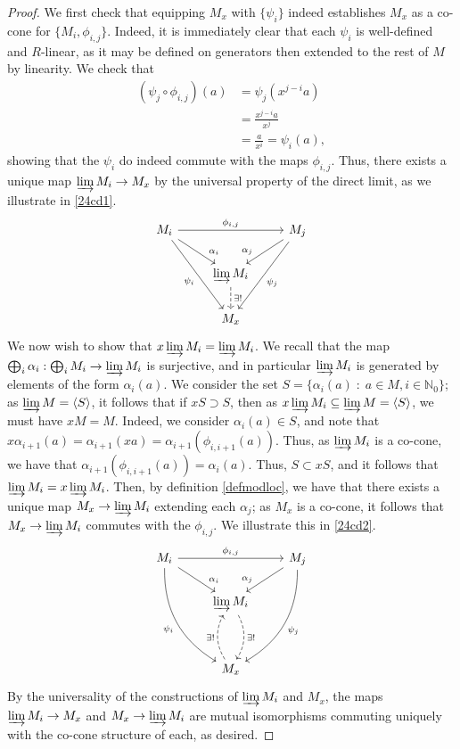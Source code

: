 \documentclass[english]{article}
\newcommand{\NN}{\mathbb{N}}
\theoremstyle{remark}
\theoremstyle{definition}
\newcommand{\idl}[1]{\left\langle{#1}\right\rangle }
\newcommand{\colim}{\varinjlim}
\begin{document}
\begin{proof}
We first check that equipping $M_x$ with $\{\psi_i\}$ indeed establishes $M_x$ as a co-cone for $\{M_i,\phi_{i,j}\}$. Indeed, it is immediately clear that each $\psi_i$ is well-defined and $R$-linear, as it may be defined on generators then extended to the rest of $M$ by linearity. We check that \begin{align*}
(\psi_j\circ\phi_{i,j})(a)&=\psi_j(x^{j-i}a)\\&=\frac{x^{j-i}a}{x^j}\\&=\frac{a}{x^i}=\psi_i(a),\end{align*} showing that the $\psi_i$ do indeed commute with the maps $\phi_{i,j}$. Thus, there exists a unique map $\colim M_i\to M_x$ by the universal property of the direct limit, as we illustrate in \eqref{24cd1}.
\begin{equation}
\label{24cd1} \begin{tikzcd}
M_i\arrow[rr,"\phi_{i,j}"]\arrow[dr,"\alpha_i", near end]\arrow[ddr,"\psi_i",swap]& &M_j\arrow[dl,"\alpha_j",swap,near end]\arrow[ddl,"\psi_j"]\\
&\colim M_i\arrow[d,dashrightarrow,"\exists!"]&\\
& M_x &
\end{tikzcd}
\end{equation} 
We now wish to show that $x\colim M_i=\colim M_i$. We recall that the map $\bigoplus_i \alpha_i:\bigoplus_i M_i\to \colim M_i$ is surjective, and in particular $\colim M_i$ is generated by elements of the form $\alpha_i(a)$. We consider the set $S=\{\alpha_i(a)\;:\;a\in M,i\in \NN_0\}$; as $\colim M=\idl{S}$, it follows that if $xS\supset S$, then as $x\colim M_i\subseteq\colim M=\idl{S}$, we must have $xM=M$. Indeed, we consider $\alpha_i(a)\in S$, and note that $x\alpha_{i+1}(a)=\alpha_{i+1}(xa)=\alpha_{i+1}(\phi_{i,i+1}(a))$. Thus, as $\colim M_i$ is a co-cone, we have that $\alpha_{i+1}(\phi_{i,i+1}(a))=\alpha_i(a)$. Thus, $S\subset xS$, and it follows that $\colim M_i=x\colim M_i$. Then, by definition \ref{defmodloc}, we have that there exists a unique map $M_x\to \colim M_i$ extending each $\alpha_j$; as $M_x$ is a co-cone, it follows that $M_x\to \colim M_i$ commutes with the $\phi_{i,j}$. We illustrate this in \eqref{24cd2}.
\begin{equation}
\label{24cd2}\begin{tikzcd}
M_i\arrow[rr,"\phi_{i,j}"]\arrow[dr,"\alpha_i", near end]\arrow[dddr,"\psi_i",swap,bend right]& &M_j\arrow[dl,"\alpha_j",swap,near end]\arrow[dddl,"\psi_j", bend left]\\
&\colim M_i\arrow[dd,dashrightarrow,"\exists!",bend left]&\\\\
& M_x \arrow[uu,dashrightarrow,"\exists!",bend left]&
\end{tikzcd}
\end{equation} 
By the universality of the constructions of $\colim M_i$ and $M_x$, the maps $\colim M_i\to M_x$ and $M_x\to \colim M_i$ are mutual isomorphisms commuting uniquely with the co-cone structure of each, as desired.
\end{proof}
\end{document}
